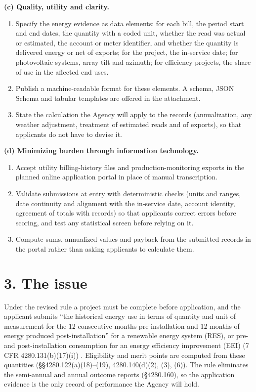 \documentclass[11pt]{article}
\begin{document}
\textbf{(c) Quality, utility and clarity.}
\begin{enumerate}
\item[C1.] Specify the energy evidence as data elements: for each bill, the period start
and end dates, the quantity with a coded unit, whether the read was actual or estimated,
the account or meter identifier, and whether the quantity is delivered energy or net of
exports; for the project, the in-service date; for photovoltaic systems, array tilt and
azimuth; for efficiency projects, the share of use in the affected end uses.
\item[C2.] Publish a machine-readable format for these elements. A schema, JSON Schema
and tabular templates are offered in the attachment.
\item[C3.] State the calculation the Agency will apply to the records (annualization,
any weather adjustment, treatment of estimated reads and of exports), so that applicants
do not have to devise it.
\end{enumerate}

\textbf{(d) Minimizing burden through information technology.}
\begin{enumerate}
\item[D1.] Accept utility billing-history files and production-monitoring exports in the
planned online application portal in place of manual transcription.
\item[D2.] Validate submissions at entry with deterministic checks (units and ranges, date
continuity and alignment with the in-service date, account identity, agreement of totals
with records) so that applicants correct errors before scoring, and test any statistical
screen before relying on it.
\item[D3.] Compute sums, annualized values and payback from the submitted records in the
portal rather than asking applicants to calculate them.
\end{enumerate}

\section*{3. The issue}

Under the revised rule a project must be complete before application, and the applicant
submits ``the historical energy use in terms of quantity and unit of measurement for the
12 consecutive months pre-installation and 12 months of energy produced
post-installation'' for a renewable energy system (RES), or pre- and post-installation
consumption for an energy efficiency improvement (EEI) (7 CFR 4280.131(b)(17)(i))
\cite{ecfr4280b}. Eligibility and merit points are computed from these quantities
(\S\S4280.122(a)(18)--(19), 4280.140(d)(2), (3), (6)). The rule eliminates the
semi-annual and annual outcome reports (\S4280.160), so the application evidence is the
only record of performance the Agency will hold.
\end{document}

